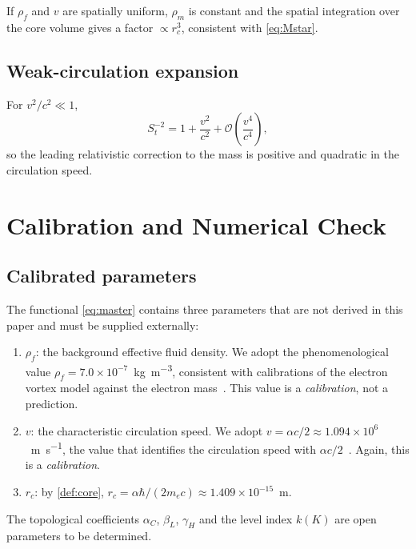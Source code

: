 \documentclass[11pt, a4paper]{article}
\newcommand{\vv}{v}          %
\newcommand{\rc}{r_c}        %
\newcommand{\rhof}{\rho_f}   %
\newcommand{\rhom}{\rho_m}   %
\newcommand{\Stv}{S_t}       %
\begin{document}
If $\rhof$ and $v$ are spatially uniform, $\rhom$ is constant
and the spatial integration over the core volume gives a
factor $\propto \rc^3$, consistent with \cref{eq:Mstar}.

\subsection{Weak-circulation expansion}

For $v^2/c^2 \ll 1$,
\begin{equation}
  \Stv^{-2} = 1 + \frac{v^2}{c^2} + \mathcal{O}\!\left(\frac{v^4}{c^4}\right),
\end{equation}
so the leading relativistic correction to the mass is positive
and quadratic in the circulation speed.

\section{Calibration and Numerical Check}
\label{sec:calib}

\subsection{Calibrated parameters}
\label{sec:calib_params}

The functional \cref{eq:master} contains three parameters
that are not derived in this paper and must be supplied
externally:
\begin{enumerate}[label=(\roman*)]
  \item $\rhof$: the background effective fluid density.
        We adopt the phenomenological value
        $\rhof = 7.0\times10^{-7}$~\si{kg.m^{-3}},
        consistent with calibrations of the electron vortex
        model against the electron mass~\cite{Iskandarani2026a}.
        This value is a \emph{calibration}, not a prediction.
  \item $\vv$: the characteristic circulation speed.
        We adopt $\vv = \alpha c/2 \approx 1.094\times10^6$~\si{m.s^{-1}},
        the value that identifies the circulation speed with
        $\alpha c/2$~\cite{Iskandarani2026a}.
        Again, this is a \emph{calibration}.
  \item $\rc$: by \cref{def:core},
        $\rc = \alpha\hbar/(2m_e c) \approx 1.409\times10^{-15}$~\si{m}.
\end{enumerate}
The topological coefficients $\alpha_C$, $\beta_L$, $\gamma_H$
and the level index $k(K)$ are open parameters to be
determined.
\end{document}
